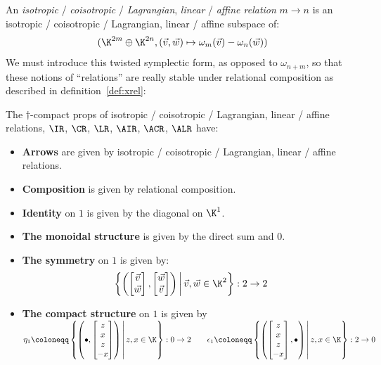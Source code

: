 An \emph{isotropic} / \emph{coisotropic} / \emph{Lagrangian}, \emph{linear} / \emph{affine relation} \(m\to n\)
is an isotropic / coisotropic / Lagrangian, linear / affine subspace of:
\[(\K^{2m} \oplus \K^{2n},  (\vec v, \vec w) \mapsto \omega_{m}(\vec v)-\omega_{n}(\vec w))\]
We must introduce this twisted symplectic form, as opposed to \(\omega_{n+m}\), so that these notions of ``relations'' are really stable under relational composition as described in definition~\ref{def:xrel}:
\begin{definition}
  The \(\dagger\)-compact props of isotropic / coisotropic / Lagrangian, linear / affine relations, \(\IR\), \(\CR\),  \(\LR\),  \(\AIR\), \(\ACR\), \(\ALR\) have:
  \begin{itemize}
    \item \textbf{Arrows} are given by isotropic / coisotropic / Lagrangian, linear / affine relations.
    \item \textbf{Composition} is given by relational composition.
  
    \item \textbf{Identity} on \(1\) is given by the diagonal on \(\K^{1}\).
    \item \textbf{The monoidal structure} is given by the direct sum and \(0\). 
    \item \textbf{The symmetry} on \(1\) is given by:
    \begin{equation*}
      \left\{\left( \begin{bmatrix} \vec v \\ \vec w \end{bmatrix}, \begin{bmatrix} \vec w \\ \vec v \end{bmatrix} \right) \,\middle|\,  \vec v, \vec w \in \K^2 \right\}:2\to 2
    \end{equation*}
    \item \textbf{The compact structure} on \(1\) is given by\\
  
    \hspace*{-.5cm} \mbox{\(
    \eta_1 \coloneqq \left\{\left(\bullet, \begin{bmatrix} z \\ x \\ z \\ -x \end{bmatrix}\right) \,\middle|\,  z,x\in \K\right\}: 0\to 2 \quad\quad
    \epsilon_1 \coloneqq \left\{\left(\begin{bmatrix} z \\ x \\ z \\ -x \end{bmatrix}, \bullet\right) \,\middle|\,  z,x\in \K\right\}: 2\to 0
  \)}\\
  

\end{itemize}
\end{definition}
